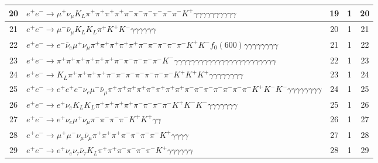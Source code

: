 \documentclass[landscape]{article}
\begin{document}
\begin{table}[htbp!]
\begin{tabular}{|c|>{\centering}p{18cm}|c|c|c|}
\hline
20 & $ e^{+} e^{-} \rightarrow \mu^{+} \nu_{\mu} K_{L} \pi^{+} \pi^{+} \pi^{+} \pi^{+} \pi^{-} \pi^{-} \pi^{-} \pi^{-} \pi^{-} \pi^{-} K^{+} \gamma \gamma \gamma \gamma \gamma \gamma \gamma \gamma \gamma \gamma $ & 19 & 1 & 20 \\
\hline
21 & $ e^{+} e^{-} \rightarrow \mu^{-} \bar{\nu}_{\mu} K_{L} K_{L} \pi^{+} K^{+} K^{-} \gamma \gamma \gamma \gamma \gamma \gamma $ & 20 & 1 & 21 \\
\hline
22 & $ e^{+} e^{-} \rightarrow e^{-} \bar{\nu}_{e} \mu^{+} \nu_{\mu} \pi^{+} \pi^{+} \pi^{+} \pi^{+} \pi^{+} \pi^{-} \pi^{-} \pi^{-} \pi^{-} \pi^{-} K^{+} K^{-} f_{0}(600) \gamma \gamma \gamma \gamma \gamma \gamma \gamma \gamma $ & 21 & 1 & 22 \\
\hline
23 & $ e^{+} e^{-} \rightarrow \pi^{+} \pi^{+} \pi^{+} \pi^{+} \pi^{+} \pi^{+} \pi^{-} \pi^{-} \pi^{-} \pi^{-} \pi^{-} K^{-} \gamma \gamma \gamma \gamma \gamma \gamma \gamma \gamma \gamma \gamma \gamma \gamma \gamma \gamma \gamma \gamma \gamma \gamma \gamma \gamma \gamma \gamma \gamma \gamma $ & 22 & 1 & 23 \\
\hline
24 & $ e^{+} e^{-} \rightarrow K_{L} \pi^{+} \pi^{+} \pi^{+} \pi^{+} \pi^{-} \pi^{-} \pi^{-} \pi^{-} \pi^{-} \pi^{-} \pi^{-} K^{+} K^{+} K^{+} \gamma \gamma \gamma \gamma \gamma \gamma \gamma \gamma $ & 23 & 1 & 24 \\
\hline
25 & $ e^{+} e^{-} \rightarrow e^{+} e^{+} e^{-} \nu_{e} \mu^{-} \bar{\nu}_{\mu} \pi^{+} \pi^{+} \pi^{+} \pi^{+} \pi^{+} \pi^{+} \pi^{+} \pi^{+} \pi^{-} \pi^{-} \pi^{-} \pi^{-} \pi^{-} \pi^{-} \pi^{-} K^{+} K^{-} K^{-} \gamma \gamma \gamma \gamma \gamma \gamma \gamma \gamma $ & 24 & 1 & 25 \\
\hline
26 & $ e^{+} e^{-} \rightarrow e^{+} \nu_{e} K_{L} K_{L} \pi^{+} \pi^{+} \pi^{+} \pi^{+} \pi^{-} \pi^{-} \pi^{-} \pi^{-} K^{+} K^{-} K^{-} \gamma \gamma \gamma \gamma \gamma \gamma \gamma $ & 25 & 1 & 26 \\
\hline
27 & $ e^{+} e^{-} \rightarrow e^{+} \nu_{e} \mu^{+} \nu_{\mu} \pi^{-} \pi^{-} \pi^{-} \pi^{-} K^{+} K^{+} \gamma \gamma $ & 26 & 1 & 27 \\
\hline
28 & $ e^{+} e^{-} \rightarrow \mu^{+} \mu^{-} \nu_{\mu} \bar{\nu}_{\mu} \pi^{+} \pi^{+} \pi^{+} \pi^{-} \pi^{-} \pi^{-} \pi^{-} K^{+} \gamma \gamma \gamma \gamma $ & 27 & 1 & 28 \\
\hline
29 & $ e^{+} e^{-} \rightarrow e^{+} \nu_{e} \nu_{\tau} \bar{\nu}_{\tau} K_{L} \pi^{+} \pi^{+} \pi^{-} \pi^{-} \pi^{-} \pi^{-} K^{+} \gamma \gamma \gamma \gamma \gamma \gamma $ & 28 & 1 & 29 \\

\end{tabular}
\end{table}
\end{document}
